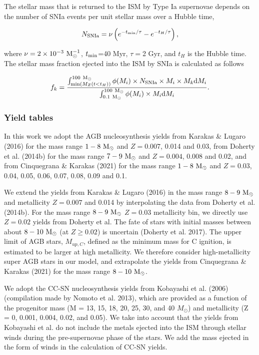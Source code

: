 \documentclass[11pt,a4paper,fleqn,usenatbib,twocolumn]{mnras}
\begin{document}
The stellar mass that is returned to the ISM by Type Ia supernovae depends on the number of SNIa events per unit stellar mass over a Hubble time,

\begin{equation}
N_{\rm{SNIa}} = \nu\left(e^{-t_{\rm{min}}/\tau}-e^{-t_{H}/\tau}\right),
\end{equation}

\noindent where $\nu=2\times 10^{-3}~\rm{M}_{\odot}^{-1}$, $t_{\rm{min}}$=40 Myr, $\tau=$2 Gyr, and $t_{H}$ is the Hubble time. The stellar mass fraction ejected into the ISM by SNIa is calculated as follows

\begin{equation}
f_{k} = \frac{\int_{{\rm{min}}(M_{Z}(t<t_{H}))}^{100~{\rm{M}}_{\odot}}  \phi(M_{i})\times N_{\rm{SNIa}}\times M_{i}\times M_{k} {\rm{d}}M_{i}}{\int_{0.1~{\rm{M}}_{\odot}}^{100~{\rm{M}}_{\odot}} \phi(M_{i})\times M_{i}{\rm{d}}M_{i}}.
\end{equation}


\subsubsection{Yield tables}

In this work we adopt the AGB nucleosynthesis yields from Karakas \& Lugaro (2016) for the mass range $1-8~\rm{M}_{\odot}$ and $Z=0.007$, 0.014 and 0.03, from Doherty et al. (2014b) for the mass range $7-9~\rm{M}_{\odot}$ and $Z=0.004$, 0.008 and 0.02, and from Cinquegrana \& Karakas (2021) for the mass range $1-8~\rm{M}_{\odot}$ and $Z=0.03$, 0.04, 0.05, 0.06, 0.07, 0.08, 0.09 and 0.1.

We extend the yields from Karakas \& Lugaro (2016) in the mass range $8-9~\rm{M}_{\odot}$ and metallicity $Z=0.007$ and 0.014 by interpolating the data from Doherty et al. (2014b). For the mass range $8-9~\rm{M}_{\odot}$ $Z=0.03$ metallicity bin, we directly use $Z=0.02$ yields from Doherty et al. The fate of stars with initial masses between about $8-10~\rm{M}_{\odot}$ (at $Z \ge 0.02$) is uncertain (Doherty et al. 2017). The upper limit of AGB stars, $M_{up,C}$, defined as the minimum mass for C ignition, is estimated to be larger at high metallicity. We therefore consider high-metallicity super AGB stars in our model, and extrapolate the yields from Cinquegrana \& Karakas (2021) for the mass range $8-10~\rm{M}_{\odot}$.

We adopt the CC-SN nucleosynthesis yields from Kobayashi et al. (2006) (compilation made by Nomoto et al. 2013), which are provided as a function of the progenitor mass (M = 13, 15, 18, 20, 25, 30, and 40 $M_{\odot}$) and metallicity (Z = 0, 0.001, 0.004, 0.02, and 0.05). We take into account that the yields from Kobayashi et al. do not include the metals ejected into the ISM through stellar winds during the pre-supernovae phase of the stars. We add the mass ejected in the form of winds in the calculation of CC-SN yields. 
\end{document}
